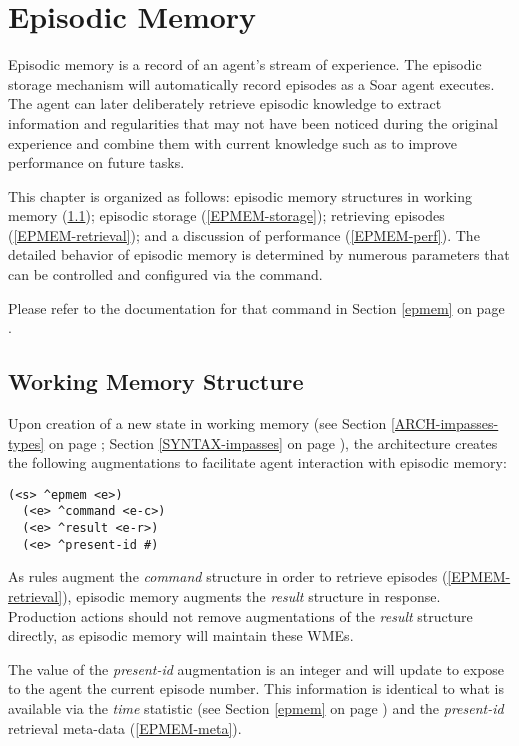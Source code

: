\chapter{Episodic Memory}
\label{EPMEM}

Episodic memory is a record of an agent's stream of experience. 
The episodic storage mechanism will automatically record episodes as a Soar agent executes. 
The agent can later deliberately retrieve episodic knowledge to extract information and regularities that may not have been noticed during the original experience and combine them with current knowledge such as to improve performance on future tasks.

This chapter is organized as follows: episodic memory structures in working memory (\ref{EPMEM-wm}); episodic storage (\ref{EPMEM-storage}); retrieving episodes (\ref{EPMEM-retrieval}); and a discussion of performance (\ref{EPMEM-perf}). 
The detailed behavior of episodic memory is determined by numerous parameters that can be controlled and configured via the  command. 

Please refer to the documentation for that command in Section \ref{epmem} on page \pageref{epmem}.

\section{Working Memory Structure}
\label{EPMEM-wm}

Upon creation of a new state in working memory (see Section \ref{ARCH-impasses-types} on page \pageref{ARCH-impasses-types}; Section \ref{SYNTAX-impasses} on page \pageref{SYNTAX-impasses}), the architecture creates the following augmentations to facilitate agent interaction with episodic memory:

\begin{verbatim}
(<s> ^epmem <e>)
  (<e> ^command <e-c>)
  (<e> ^result <e-r>)
  (<e> ^present-id #)
\end{verbatim}

As rules augment the \emph{command} structure in order to retrieve episodes (\ref{EPMEM-retrieval}), episodic memory augments the \emph{result} structure in response.
Production actions should not remove augmentations of the \emph{result} structure directly, as episodic memory will maintain these WMEs.

The value of the \emph{present-id} augmentation is an integer and will update to expose to the agent the current episode number.
This information is identical to what is available via the \emph{time} statistic (see Section \ref{epmem} on page \pageref{epmem}) and the \emph{present-id} retrieval meta-data (\ref{EPMEM-meta}).

